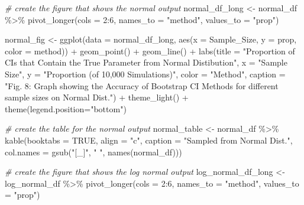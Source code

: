 \documentclass[12pt]{article}
\newenvironment{Shaded}{\begin{snugshade}}{\end{snugshade}}
\newcommand{\AttributeTok}[1]{\textcolor[rgb]{0.77,0.63,0.00}{#1}}
\newcommand{\CommentTok}[1]{\textcolor[rgb]{0.56,0.35,0.01}{\textit{#1}}}
\newcommand{\ConstantTok}[1]{\textcolor[rgb]{0.00,0.00,0.00}{#1}}
\newcommand{\DecValTok}[1]{\textcolor[rgb]{0.00,0.00,0.81}{#1}}
\newcommand{\FunctionTok}[1]{\textcolor[rgb]{0.00,0.00,0.00}{#1}}
\newcommand{\NormalTok}[1]{#1}
\newcommand{\OtherTok}[1]{\textcolor[rgb]{0.56,0.35,0.01}{#1}}
\newcommand{\SpecialCharTok}[1]{\textcolor[rgb]{0.00,0.00,0.00}{#1}}
\newcommand{\StringTok}[1]{\textcolor[rgb]{0.31,0.60,0.02}{#1}}
\begin{document}
\begin{Shaded}
\begin{Highlighting}[]
\CommentTok{\# create the figure that shows the normal output }
\NormalTok{normal\_df\_long }\OtherTok{\textless{}{-}}\NormalTok{ normal\_df }\SpecialCharTok{\%\textgreater{}\%}
  \FunctionTok{pivot\_longer}\NormalTok{(}\AttributeTok{cols =} \DecValTok{2}\SpecialCharTok{:}\DecValTok{6}\NormalTok{, }\AttributeTok{names\_to =} \StringTok{"method"}\NormalTok{, }\AttributeTok{values\_to =} \StringTok{"prop"}\NormalTok{) }
    
\NormalTok{normal\_fig }\OtherTok{\textless{}{-}} \FunctionTok{ggplot}\NormalTok{(}\AttributeTok{data =}\NormalTok{ normal\_df\_long, }
                    \FunctionTok{aes}\NormalTok{(}\AttributeTok{x =}\NormalTok{ Sample\_Size, }\AttributeTok{y =}\NormalTok{ prop, }\AttributeTok{color =}\NormalTok{ method)) }\SpecialCharTok{+} 
  \FunctionTok{geom\_point}\NormalTok{() }\SpecialCharTok{+} \FunctionTok{geom\_line}\NormalTok{() }\SpecialCharTok{+} 
  \FunctionTok{labs}\NormalTok{(}\AttributeTok{title =} \StringTok{"Proportion of CIs that Contain the True Parameter from Normal }
\StringTok{       Distibution"}\NormalTok{, }\AttributeTok{x =} \StringTok{"Sample Size"}\NormalTok{, }
       \AttributeTok{y =} \StringTok{"Proportion (of 10,000 Simulations)"}\NormalTok{, }\AttributeTok{color =} \StringTok{"Method"}\NormalTok{,}
       \AttributeTok{caption =} \StringTok{"Fig. 8: Graph showing the Accuracy of Bootstrap CI Methods for different sample sizes on Normal Dist."}\NormalTok{) }\SpecialCharTok{+}
  \FunctionTok{theme\_light}\NormalTok{() }\SpecialCharTok{+}
  \FunctionTok{theme}\NormalTok{(}\AttributeTok{legend.position=}\StringTok{"bottom"}\NormalTok{)}

\CommentTok{\# create the table for the normal output}
\NormalTok{normal\_table }\OtherTok{\textless{}{-}}\NormalTok{ normal\_df }\SpecialCharTok{\%\textgreater{}\%}
  \FunctionTok{kable}\NormalTok{(}\AttributeTok{booktabs =} \ConstantTok{TRUE}\NormalTok{, }\AttributeTok{align =} \StringTok{"c"}\NormalTok{, }\AttributeTok{caption =} \StringTok{"Sampled from Normal Dist."}\NormalTok{, }
        \AttributeTok{col.names =} \FunctionTok{gsub}\NormalTok{(}\StringTok{"[\_]"}\NormalTok{, }\StringTok{" "}\NormalTok{, }\FunctionTok{names}\NormalTok{(normal\_df)))}

\CommentTok{\# create the figure that shows the log normal output}
\NormalTok{log\_normal\_df\_long }\OtherTok{\textless{}{-}}\NormalTok{ log\_normal\_df }\SpecialCharTok{\%\textgreater{}\%}
  \FunctionTok{pivot\_longer}\NormalTok{(}\AttributeTok{cols =} \DecValTok{2}\SpecialCharTok{:}\DecValTok{6}\NormalTok{, }\AttributeTok{names\_to =} \StringTok{"method"}\NormalTok{, }\AttributeTok{values\_to =} \StringTok{"prop"}\NormalTok{) }
    

\end{Highlighting}
\end{Shaded}
\end{document}
